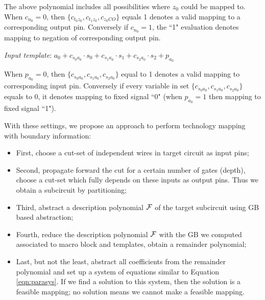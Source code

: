 The above polynomial includes all possibilities where $z_0$ could be mapped to.
When $c_{n_0} = 0$, then $\{c_{t_0z_0},c_{t_1z_0},c_{z_0CO}\}$ equals 1 denotes a valid mapping to a corresponding output pin. 
Conversely if $c_{n_0} = 1$, the ``1" evaluation denotes mapping to negation of corresponding output pin.

{\it Input template}: $a_0+c_{s_0a_0}\cdot s_0+c_{s_1a_0}\cdot s_1+c_{s_2a_0}\cdot s_2+p_{a_0}$

When $p_{a_0} = 0$, then $\{c_{s_0a_0},c_{s_1a_0},c_{s_2a_0}\}$ equal to 1 denotes a valid mapping to corresponding input
pin. Conversely if every variable in set $\{c_{s_0a_0},c_{s_1a_0},c_{s_2a_0}\}$ equals to 0, 
it denotes mapping to fixed signal ``0" (when $p_{a_0} = 1$ then
mapping to fixed signal ``1").

With these settings, we propose an approach to perform technology mapping with boundary information:
\begin{itemize}
\item First, choose a cut-set of independent wires in target circuit as input pins;

\item Second, propagate forward the cut for a certain number of gates (depth), choose a cut-set
which fully depends on these inputs as output pins. Thus we obtain a subcircuit by partitioning;

\item Third, abstract a description polynomial ${\mathcal{F}}$ of the target subcircuit using GB based abstraction;

\item Fourth, reduce the description polynomial ${\mathcal{F}}$ with the GB we computed associated to macro block 
and templates, obtain a remainder polynomial;

\item Last, but not the least, abstract all coefficients from the remainder polynomial and set up 
a system of equations similar to Equation \ref{eqn:parasys}.
If we find a solution to this system, then the solution is a feasible mapping; no solution means we cannot make a
feasible mapping.
\end{itemize}
